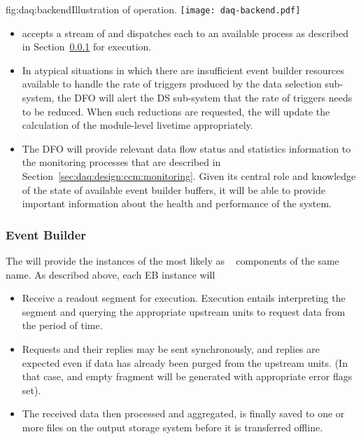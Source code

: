 \begin{dunefigure}{fig:daq:backend}{Illustration of   operation.}
  \texttt{[image: daq-backend.pdf]}
\end{dunefigure}

\begin{itemize}
\item {} accepts a stream of  and dispatches each to an available  process as described in Section~\ref{sec:fd-daq:design-event-builder} for execution.
\item In atypical situations in which there are insufficient event builder resources available to handle the rate of triggers produced by the data selection sub-system, the DFO will alert the DS sub-system that the rate of triggers needs to be reduced.  When such reductions are requested, the  will update the calculation of the module-level  livetime appropriately.
\item The DFO will provide relevant data flow status and statistics information to the monitoring processes that are described in Section~\ref{sec:daq:design:ccm:monitoring}. Given its central role and knowledge of the state of available event builder buffers, it will be able to provide important information about the health and performance of the system.
\end{itemize}

\subsubsection{Event Builder}
\label{sec:fd-daq:design-event-builder}

The  will provide the instances of the  most likely as
~\cite{artdaq} components of the same name. 
As described above, each EB instance will

\begin{itemize}
  \item Receive a readout segment for execution. Execution entails interpreting the  segment and querying the appropriate upstream  units to request data from the period of time. 
  \item Requests and their replies may be sent synchronously, and replies are expected even if data has already been purged from the upstream  units. (In that case, and empty fragment will be generated with appropriate error flags set).
  \item The received data then processed and aggregated, is finally saved to one or more files on the output storage system before it is transferred offline.
\end{itemize}


